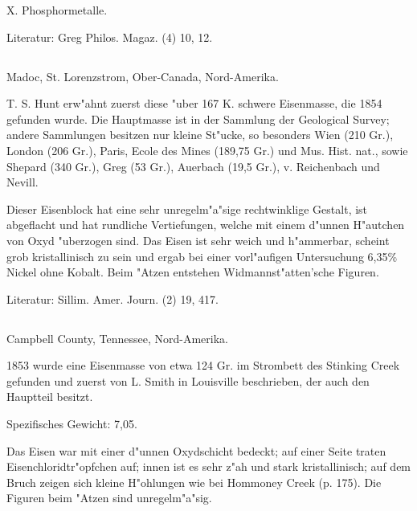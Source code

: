 \documentclass[a4paper, 11pt, oneside]{article}
\begin{document}
X. Phosphormetalle.

\normalsize
Literatur: Greg Philos. Magaz. (4) 10, 12.

\subsection{}
\LARGE
\paragraph{}
Madoc, St. Lorenzstrom, Ober-Canada, Nord-Amerika.

T. S. Hunt erw"ahnt zuerst diese "uber 167 K. schwere Eisenmasse, die 1854 gefunden wurde. Die Hauptmasse ist in der Sammlung der Geological Survey; andere Sammlungen besitzen nur kleine St"ucke, so besonders Wien (210 Gr.), London (206 Gr.), Paris, Ecole des Mines (189,75 Gr.) und Mus. Hist. nat., sowie Shepard (340 Gr.), Greg (53 Gr.), Auerbach (19,5 Gr.), v. Reichenbach und Nevill.

Dieser Eisenblock hat eine sehr unregelm"a"sige rechtwinklige Gestalt, ist abgeflacht und hat rundliche Vertiefungen, welche mit einem d"unnen H"autchen von Oxyd "uberzogen sind. Das Eisen ist sehr weich und h"ammerbar, scheint grob kristallinisch zu sein und ergab bei einer vorl"aufigen Untersuchung 6,35\% Nickel ohne Kobalt. Beim "Atzen entstehen Widmannst"atten'sche Figuren.

\normalsize
Literatur: Sillim. Amer. Journ. (2) 19, 417.

\subsection{}
\LARGE
\paragraph{}
Campbell County, Tennessee, Nord-Amerika.

1853 wurde eine Eisenmasse von etwa 124 Gr. im Strombett des Stinking Creek gefunden und zuerst von L. Smith in Louisville beschrieben, der auch den Hauptteil besitzt.

Spezifisches Gewicht: 7,05.

Das Eisen war mit einer d"unnen Oxydschicht bedeckt; auf einer Seite traten Eisenchloridtr"opfchen auf; innen ist es sehr z"ah und stark kristallinisch; auf dem Bruch zeigen sich kleine H"ohlungen wie bei Hommoney Creek (p. 175). Die Figuren beim "Atzen sind unregelm"a"sig.
\end{document}
